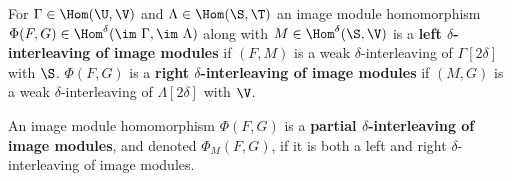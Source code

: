 

\begin{definition}
  For $\Gamma\in\Hom(\U,\V)$ and $\Lambda\in\Hom(\S,\T)$ an image module homomorphism $\Phi(F, G)\in\Hom^\delta(\im~\Gamma,\im~\Lambda)$ along with $M\in\Hom^\delta(\S,\V)$ is a \textbf{left $\delta$-interleaving of image modules} if $(F, M)$ is a weak $\delta$-interleaving of $\Gamma[2\delta]$ with $\S$.
  $\Phi(F, G)$ is a \textbf{right $\delta$-interleaving of image modules} if $(M, G)$ is a weak $\delta$-interleaving of $\Lambda[2\delta]$ with $\V$.

  An image module homomorphism $\Phi(F, G)$ is a \textbf{partial $\delta$-interleaving of image modules}, and denoted $\Phi_M(F, G)$, if it is both a left and right $\delta$-interleaving of image modules.
\end{definition}

